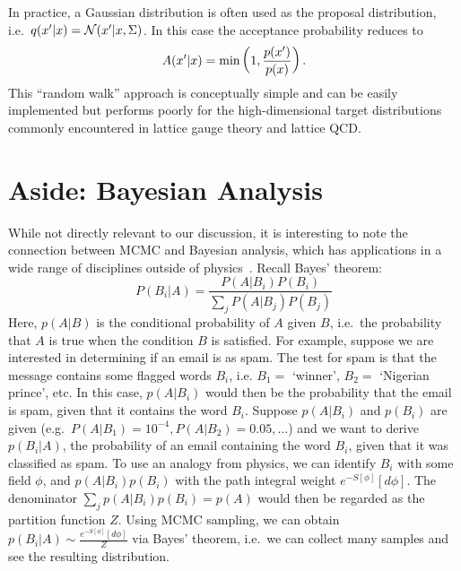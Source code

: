 \documentclass[../main.tex]{subfiles}
\begin{document}
In practice, a Gaussian distribution is often used as the proposal
distribution, i.e.\ $q({x^{\prime}} | x) = \mathcal{N}({x^{\prime}} | x, \Sigma)$. In this case
the acceptance probability reduces to
%
\begin{equation}
  A({x^{\prime}} | x) = \min\left(1, \frac{p({x^{\prime}})}{p(x)}\right).
\end{equation}
%
This ``random walk'' approach is conceptually simple and can be easily
implemented but performs poorly for the high-dimensional target distributions
commonly encountered in lattice gauge theory and lattice QCD.
%
%
%
%
\section{Aside: Bayesian Analysis}
%
While not directly relevant to our discussion, it is interesting to note the
connection between MCMC and Bayesian analysis, which has applications in a wide
range of disciplines outside of physics~\cite{Hanada_2018}.
%
Recall Bayes' theorem:
%
\begin{equation}
  P(B_{i}|A) = \frac{P(A|B_{i})P(B_{i})}{\sum_{j}P(A|B_{j})P(B_{j})}
  \label{eq:bayes_theorem}
\end{equation}
%
Here, $p(A|B)$ is the conditional probability of $A$ given $B$, i.e.\ the
probability that $A$ is true when the condition $B$ is satisfied. 
%
For example, suppose we are interested in determining if an email is as spam.
The test for spam is that the message contains some flagged words $B_{i}$, i.e.
$B_{1} =$ `winner', $B_{2}=$ `Nigerian prince', etc.
%
In this case, $p(A|B_{i})$ would then be the probability that the email is
spam, given that it contains the word $B_{i}$.
%
Suppose $p(A|B_{i})$ and $p(B_{i})$ are given (e.g.\ $P(A|B_{1}) = 10^{-4},
P(A|B_{2}) = 0.05, \ldots$) and we want to derive $p(B_{i}|A)$, the probability
of an email containing the word $B_{i}$, given that it was classified as spam.
%
To use an analogy from physics, we can identify $B_{i}$ with some field $\phi$,
and $p(A|B_{i}) p(B_{i})$ with the path integral weight $e^{-S[\phi]}[d\phi]$.
%
The denominator $\sum_{j} p(A|B_{i}) p(B_{i}) = p(A)$ would then be regarded as
the partition function $Z$.
%
Using MCMC sampling, we can obtain $p(B_{i}|A) \sim
\frac{e^{-S[\phi]}[d\phi]}{Z}$ via Bayes' theorem, i.e.\ we can collect many
samples and see the resulting distribution.
%
%
%
\end{document}
